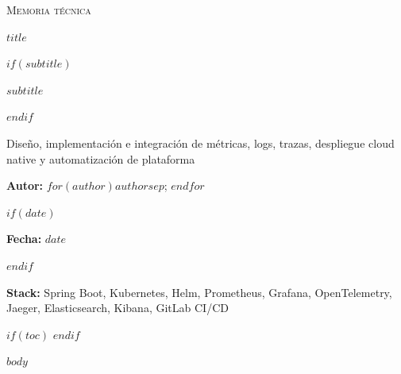 ﻿\documentclass[
$for(classoption)$
$classoption$$sep$,
$endfor$
]{$documentclass$}
\begin{document}
\begin{titlepage}
  \thispagestyle{empty}
  \vspace*{2.2cm}

  {\large\scshape Memoria técnica\par}
  \vspace{1.6cm}

  {\Huge\bfseries $title$\par}
  \vspace{0.8cm}

$if(subtitle)$
  {\Large $subtitle$\par}
  \vspace{1.4cm}
$endif$

  {\large Diseño, implementación e integración de métricas, logs, trazas, despliegue cloud native y automatización de plataforma\par}
  \vspace{2.0cm}

  {\large\textbf{Autor:} $for(author)$$author$$sep$; $endfor$\par}
  \vspace{0.25cm}
$if(date)$
  {\large\textbf{Fecha:} $date$\par}
  \vspace{0.25cm}
$endif$
  {\large\textbf{Stack:} Spring Boot, Kubernetes, Helm, Prometheus, Grafana, OpenTelemetry, Jaeger, Elasticsearch, Kibana, GitLab CI/CD\par}

  \vfill
\end{titlepage}

\setcounter{page}{1}

$if(toc)$
{
  \hypersetup{linkcolor=black}
  \tableofcontents
}
\clearpage
$endif$

$body$
\end{document}
